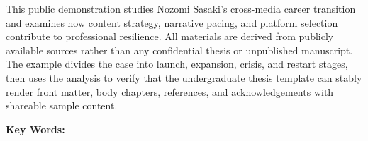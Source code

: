 
This public demonstration studies Nozomi Sasaki's cross-media career transition and examines how content strategy, narrative pacing, and platform selection contribute to professional resilience. All materials are derived from publicly available sources rather than any confidential thesis or unpublished manuscript. The example divides the case into launch, expansion, crisis, and restart stages, then uses the analysis to verify that the undergraduate thesis template can stably render front matter, body chapters, references, and acknowledgements with shareable sample content.

\vspace{1.6cm}
\noindent\textbf{Key Words:}\justKeywordsEn

